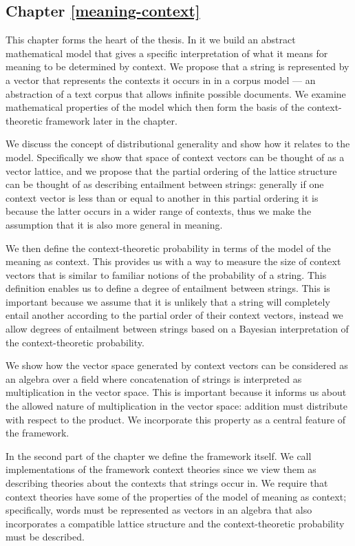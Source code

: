 \subsection*{Chapter \ref{meaning-context}}

This chapter forms the heart of the thesis. In it we build an abstract mathematical model that gives a specific interpretation of what it means for meaning to be determined by context. We propose that a string is represented by a vector that represents the contexts it occurs in in a corpus model --- an abstraction of a text corpus that allows infinite possible documents. We examine mathematical properties of the model which then form the basis of the context-theoretic framework later in the chapter.

We discuss the concept of distributional generality and show how it relates to the model. Specifically we show that space of context vectors can be thought of as a vector lattice, and we propose that the partial ordering of the lattice structure can be thought of as describing entailment between strings: generally if one context vector is less than or equal to another in this partial ordering it is because the latter occurs in a wider range of contexts, thus we make the assumption that it is also more general in meaning.

We then define the context-theoretic probability in terms of the model of the meaning as context. This provides us with a way to measure the size of context vectors that is similar to familiar notions of the probability of a string. This definition enables us to define a degree of entailment between strings. This is important because we assume that it is unlikely that a string will completely entail another according to the partial order of their context vectors, instead we allow degrees of entailment between strings based on a Bayesian interpretation of the context-theoretic probability.

We show how the vector space generated by context vectors can be considered as an algebra over a field where concatenation of strings is interpreted as multiplication in the vector space. This is important because it informs us about the allowed nature of multiplication in the vector space: addition must distribute with respect to the product. We incorporate this property as a central feature of the framework.

In the second part of the chapter we define the framework itself. We call implementations of the framework context theories since we view them as describing theories about the contexts that strings occur in. We require that context theories have some of the properties of the model of meaning as context; specifically, words must be represented as vectors in an algebra that also incorporates a compatible lattice structure and the context-theoretic probability must be described.

